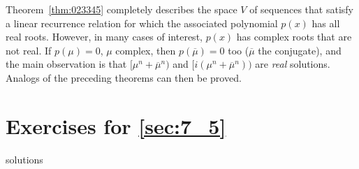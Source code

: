 \vspace{1em}

\noindent Theorem~\ref{thm:023345} completely describes the space $V$ of sequences that satisfy a linear recurrence relation for which the associated polynomial $p(x)$ has all real roots. However, in many cases of interest, $p(x)$ has complex roots that are not real. If $p(\mu) = 0$, $\mu$ complex, then $p(\overline{\mu}) = 0$ too ($\overline{\mu}$ the conjugate), and the main observation is that $[\mu^n + \overline{\mu}^n)$ and $[i(\mu^n + \overline{\mu}^n))$ are \textit{real} solutions. Analogs of the preceding theorems can then be proved.


\section*{Exercises for \ref{sec:7_5}}

\begin{Filesave}{solutions}
\end{Filesave}

